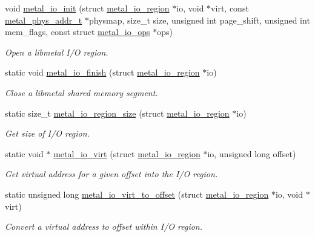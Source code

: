 \begin{DoxyCompactItemize}
\item 
void \hyperlink{group__io_ga38e0b74d5b2b1f01873a2479494bb89e}{metal\+\_\+io\+\_\+init} (struct \hyperlink{structmetal__io__region}{metal\+\_\+io\+\_\+region} $\ast$io, void $\ast$virt, const \hyperlink{group__system_gae024fa10b72199a3e26c29b6eb97df5d}{metal\+\_\+phys\+\_\+addr\+\_\+t} $\ast$physmap, size\+\_\+t size, unsigned int page\+\_\+shift, unsigned int mem\+\_\+flags, const struct \hyperlink{structmetal__io__ops}{metal\+\_\+io\+\_\+ops} $\ast$ops)
\begin{DoxyCompactList}\small\item\em Open a libmetal I/O region. \end{DoxyCompactList}\item 
static void \hyperlink{group__io_gab0457348d0b2b4a4b211e255ac565d24}{metal\+\_\+io\+\_\+finish} (struct \hyperlink{structmetal__io__region}{metal\+\_\+io\+\_\+region} $\ast$io)
\begin{DoxyCompactList}\small\item\em Close a libmetal shared memory segment. \end{DoxyCompactList}\item 
static size\+\_\+t \hyperlink{group__io_ga2c5a380308c94d119a3ca200f7d4399f}{metal\+\_\+io\+\_\+region\+\_\+size} (struct \hyperlink{structmetal__io__region}{metal\+\_\+io\+\_\+region} $\ast$io)
\begin{DoxyCompactList}\small\item\em Get size of I/O region. \end{DoxyCompactList}\item 
static void $\ast$ \hyperlink{group__io_ga3e78643879397a91e796d06e05d0072a}{metal\+\_\+io\+\_\+virt} (struct \hyperlink{structmetal__io__region}{metal\+\_\+io\+\_\+region} $\ast$io, unsigned long offset)
\begin{DoxyCompactList}\small\item\em Get virtual address for a given offset into the I/O region. \end{DoxyCompactList}\item 
static unsigned long \hyperlink{group__io_gac251d178b2cf9ea9903838a547ca018d}{metal\+\_\+io\+\_\+virt\+\_\+to\+\_\+offset} (struct \hyperlink{structmetal__io__region}{metal\+\_\+io\+\_\+region} $\ast$io, void $\ast$virt)
\begin{DoxyCompactList}\small\item\em Convert a virtual address to offset within I/O region. \end{DoxyCompactList}\item 

\end{DoxyCompactItemize}
